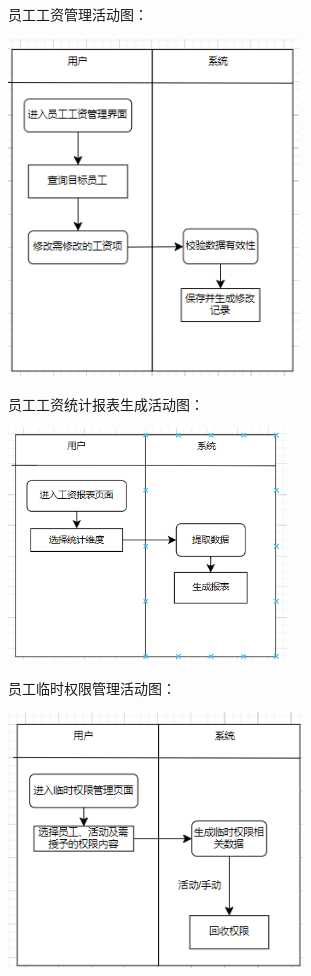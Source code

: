 \documentclass[]{article}
\let\oldincludegraphics\includegraphics
\renewcommand{\includegraphics}[2][]{%
  \begin{center}\oldincludegraphics[#1]{#2}\end{center}%
}
\begin{document}
员工工资管理活动图：

\includegraphics[width=3.02917in,height=3.51458in]{media/media/image11.png}

员工工资统计报表生成活动图：

\includegraphics[width=2.90764in,height=2.41597in]{media/media/image12.png}

员工临时权限管理活动图：

\includegraphics[width=3.075in,height=2.66458in]{media/media/image13.png}
\end{document}

